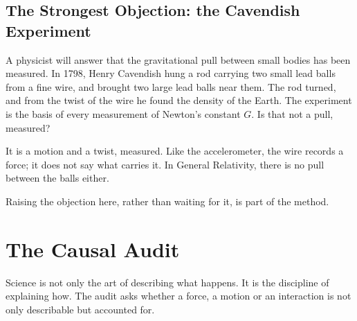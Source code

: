 \documentclass[11pt,a4paper]{article}
\begin{document}
\subsection*{The Strongest Objection: the Cavendish Experiment}

A physicist will answer that the gravitational pull between small bodies has been measured. In 1798, Henry Cavendish hung a rod carrying two small lead balls from a fine wire, and brought two large lead balls near them. The rod turned, and from the twist of the wire he found the density of the Earth. The experiment is the basis of every measurement of Newton's constant $G$. Is that not a pull, measured?

It is a motion and a twist, measured. Like the accelerometer, the wire records a force; it does not say what carries it. In General Relativity, there is no pull between the balls either.  

Raising the objection here, rather than waiting for it, is part of the method.

\section{The Causal Audit}
\label{sec:audit}

Science is not only the art of describing what happens. It is the discipline of explaining how. The audit asks whether a force, a motion or an interaction is not only describable but accounted for.
\end{document}
